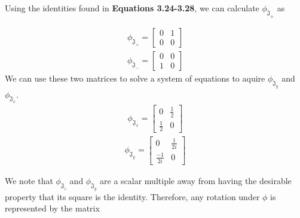 \documentclass[10pt]{ucthesis}
\begin{document}
Using the identities found in \textbf{Equations 3.24-3.28}, we can calculate $\phi_{\mathfrak{J}_\pm}$ as 

\begin{equation}
\begin{aligned}
	\phi_{\mathfrak{J}_+} = \begin{bmatrix}
									0 & 1 \\
									0 & 0
								\end{bmatrix}
\end{aligned}
\end{equation}
\begin{equation}
\begin{aligned}
	\phi_{\mathfrak{J}_-} = \begin{bmatrix}
									0 & 0 \\
									1 & 0
								\end{bmatrix}
\end{aligned}
\end{equation}
We can use these two matrices to solve a system of equations to aquire $\phi_{\mathfrak{J}_y}$ and $\phi_{\mathfrak{J}_x}$.
\begin{equation}
\begin{aligned}
	\phi_{\mathfrak{J}_x} = \begin{bmatrix}
									0 & \frac{1}{2} \\
									\frac{1}{2} & 0
								\end{bmatrix}
\end{aligned}
\end{equation}
\begin{equation}
\begin{aligned}
	\phi_{\mathfrak{J}_y} = \begin{bmatrix}
									0 & \frac{1}{2i} \\
									\frac{-1}{2i} & 0
								\end{bmatrix}
\end{aligned}
\end{equation}

We note that $\phi_{\mathfrak{J}_z}$ and $\phi_{\mathfrak{J}_y}$ are a scalar multiple away from having the desirable property that its square is the identity. Therefore, any rotation under $\phi$ is represented by the matrix
\end{document}
